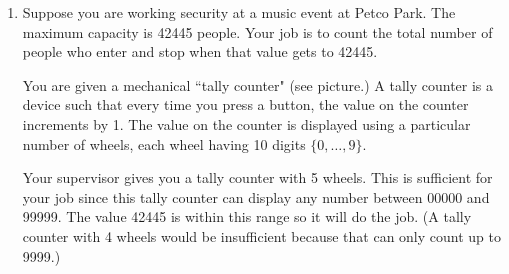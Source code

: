\documentclass[10pt,letterpaper,unboxed,cm]{article}
\begin{document}
\begin{enumerate}
	      Another benefit of dozenal is when you use it to represent fractional quantities.

	      The analogous notation of a ``decimal point" is a ``dozenal semicolon". The way it works is similar to a decimal point.

	      For example, the number $0.1$ is equal to the fraction $1/10$ and the number $\emph{0;1}$ is equal to the fraction $\emph{1/10}=1/12$. Similarly, $\emph{0;01=1/100}=1/144$ and $\emph{0;001=1/1000}=1/1728$.

	      \begin{quote}
		      {\bf Exercise 5:}

		      For each decimal fraction, write the dozenal semicolon notation of the number. For example, for the fraction 1/2, the dozenal semicolon notation would be $\emph{0;6}$ since $1/2=6/12$.

		      \begin{itemize}
			      \item
			            2/3
			      \item
			            1/6
			      \item
			            5/24
			      \item
			            8/27
		      \end{itemize}
	      \end{quote}

	      \begin{quote}
		      {\bf Exercise 6:} (for fair effort completeness:)

		      What is one example (not mentioned in the homework) where you would prefer dozenal over decimal?

		      What is one example (not mentioned in the homework) where you would prefer decimal over dozenal?
	      \end{quote}


	\item
	      Suppose you are working security at a music event at Petco Park. The maximum capacity is 42445 people. Your job is to count the total number of people who enter and stop when that value gets to 42445.

	      You are given a mechanical ``tally counter" (see picture.) A tally counter is a device such that every time you press a button, the value on the counter increments by 1. The value on the counter is displayed using a particular number of wheels, each wheel having 10 digits $\{0,\dots,9\}$.

	      Your supervisor gives you a tally counter with 5 wheels. This is sufficient for your job since this tally counter can display any number between 00000 and 99999. The value 42445 is within this range so it will do the job. (A tally counter with 4 wheels would be insufficient because that can only count up to 9999.)


\end{enumerate}
\end{document}
